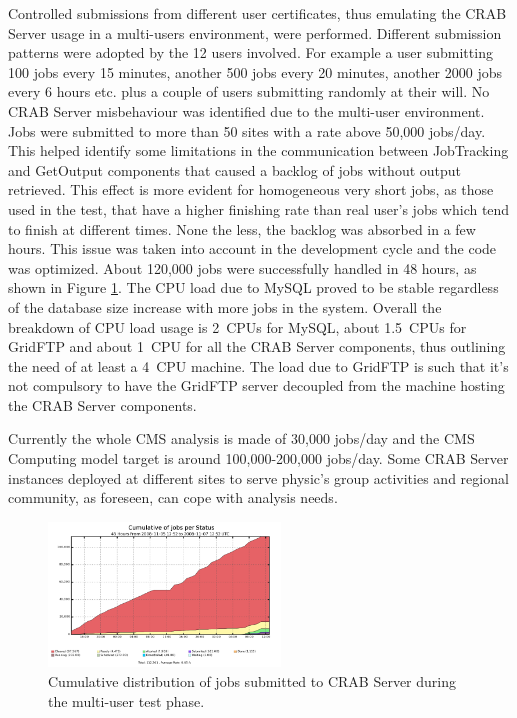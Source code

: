 Controlled submissions from different user certificates, thus 
emulating the CRAB Server usage in a multi-users environment, were performed.
Different submission patterns were adopted by the 12 users
involved. For example a user submitting 100 jobs every 15 minutes,
another 500 jobs every 20 minutes, another 2000 jobs every 6 hours
etc. plus a couple of users submitting randomly at their will.  No
CRAB Server misbehaviour was identified due to the multi-user
environment. %
Jobs were submitted to more than 50 sites with a rate above 50,000 jobs/day.
This helped identify some limitations in the communication between 
JobTracking and GetOutput components that caused a backlog of jobs without output retrieved. This effect is more evident for homogeneous very short
jobs, as those used in the test, that have a higher finishing rate
than real user's jobs which tend to finish at different times. None
the less, the backlog was absorbed in a few hours. This issue was
taken into account in the development cycle and the code was
optimized.  About 120,000 jobs were successfully handled in 48 hours,
as shown in Figure \ref{fig:stressmulti}.  The CPU load due to MySQL
proved to be stable regardless of the database size increase with more
jobs in the system. Overall the breakdown of CPU load usage is 2~CPUs
for MySQL, about 1.5~CPUs for GridFTP and about 1~CPU for all the CRAB
Server components, thus outlining the need of at least a 4~CPU
machine.  The load due to GridFTP is such that it's not compulsory to
have the GridFTP server decoupled from the machine hosting the CRAB
Server components.

Currently the whole CMS analysis is made of 30,000 jobs/day and the
CMS Computing model target is around 100,000-200,000 jobs/day. Some
CRAB Server instances deployed at different sites to serve physic's
group activities and regional community, as foreseen, can cope with
analysis needs.
\begin{figure}
\centering
\includegraphics[width=0.55\textwidth]{figures/MultiUserJobStatus.png}
\caption{Cumulative distribution of jobs submitted to CRAB Server
  during the multi-user test phase. }
\label{fig:stressmulti}
\end{figure}



